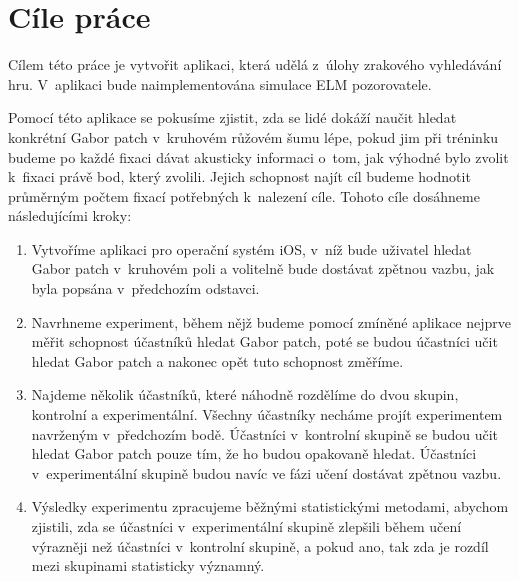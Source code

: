 \chapter{Cíle práce}

Cílem této práce je vytvořit aplikaci, která udělá z~úlohy zrakového vyhledávání
hru. V~aplikaci bude naimplementována simulace ELM pozorovatele. 

Pomocí této aplikace se pokusíme zjistit, zda se lidé dokáží naučit hledat konkrétní Gabor
patch v~kruhovém růžovém šumu lépe, pokud jim při tréninku budeme po každé
fixaci dávat akusticky informaci o~tom, jak výhodné bylo zvolit k~fixaci
právě bod, který zvolili. Jejich schopnost najít cíl budeme hodnotit
průměrným počtem fixací potřebných k~nalezení cíle. Tohoto cíle dosáhneme
následujícími kroky:

\begin{enumerate}

\item Vytvoříme aplikaci pro operační systém iOS, v~níž bude uživatel hledat
Gabor patch v~kruhovém poli a volitelně bude dostávat zpětnou vazbu, jak byla
popsána v~předchozím odstavci.

\item Navrhneme experiment, během nějž budeme pomocí zmíněné aplikace nejprve
měřit schopnost účastníků hledat Gabor patch, poté se budou účastníci učit
hledat Gabor patch a nakonec opět tuto schopnost změříme.

\item Najdeme několik účastníků, které náhodně rozdělíme do dvou skupin,
kontrolní a experimentální. Všechny účastníky necháme projít experimentem
navrženým v~předchozím bodě. Účastníci v~kontrolní skupině se budou učit hledat
Gabor patch pouze tím, že ho budou opakovaně hledat. Účastníci v~experimentální
skupině budou navíc ve fázi učení dostávat zpětnou vazbu.

\item Výsledky experimentu zpracujeme běžnými statistickými metodami, aby\-chom
zjistili, zda se účastníci v~experimentální skupině zlepšili během učení výrazněji
než účastníci v~kontrolní skupině, a pokud ano, tak zda je rozdíl mezi
skupinami statisticky významný.

\end{enumerate} 
